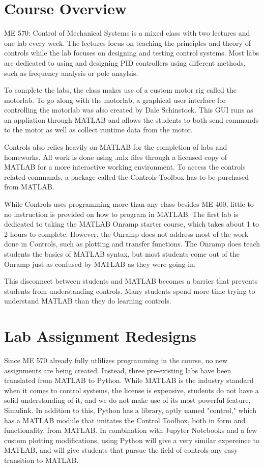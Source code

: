 \section{Course Overview}

ME 570: Control of Mechanical Systems is a mixed class with two lectures and one lab every week. The lectures focus on teaching
the principles and theory of controls while the lab focuses on designing and testing control systems. Most labs are dedicated to
using and designing PID controllers using different methods, such as frequency analysis or pole anaylsis.

To complete the labs, the class makes use of a custom motor rig called the motorlab. To go along with the motorlab, a graphical 
user interface for controlling the motorlab was also created by Dale Schinstock. This GUI runs as an appliation through MATLAB 
and allows the students to both send commands to the motor as well as collect runtime data from the motor.

Controls also relies heavily on MATLAB for the completion of labs and homeworks. All work is done using .mlx files through a 
licensed copy of MATLAB for a more interactive working environment. To access the controls related commands, a package called 
the Controls Toolbox has to be purchased from MATLAB. 

While Controls uses programming more than any class besides ME 400, little to no instruction is provided on how to program in MATLAB.
The first lab is dedicated to taking the MATLAB Onramp starter course, which takes about 1 to 2 hours to complete. However, the 
Onramp does not address most of the work done in Controls, such as plotting and transfer functions. The Onramp does teach students
the basics of MATLAB syntax, but most students come out of the Onramp just as confused by MATLAB as they were going in.

This disconnect between students and MATLAB becomes a barrier that prevents students from understanding controls. Many students
spend more time trying to understand MATLAB than they do learning controls. 

\section{Lab Assignment Redesigns}

Since ME 570 already fully utlilizes programming in the course, no new assignments are being created. Instead, three pre-existing
labs have been translated from MATLAB to Python. While MATLAB is the industry standard when it comes to control systems, the
license is expensive, students do not have a solid understanding of it, and we do not make use of its most powerful feature,
Simulink. In addition to this, Python has a library, aptly named "control," which has a MATLAB module that imitates the Control
Toolbox, both in form and functionality, from MATLAB. In combination with Jupyter Notebooks and a few custom plotting modifications,
using Python will give a very similar expereince to MATLAB, and will give students that pursue the field of controls any easy
transition to MATLAB. 

